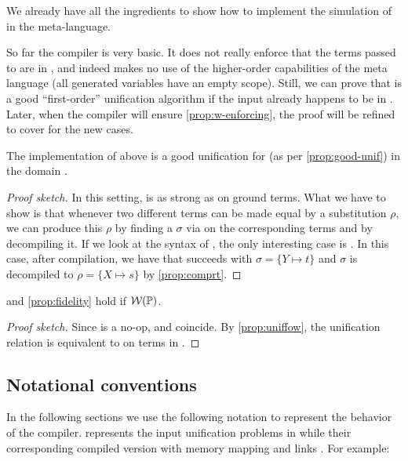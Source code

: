 We already have all the ingredients to show how to implement the simulation of
\Uo{} in the meta-language.



\noindent
So far the compiler is very basic. It does not really
enforce that the terms passed to \hstep are in \wellb,
and indeed makes no use of the higher-order capabilities
of the meta language (all generated
variables have an empty scope).
Still, we can prove that \Uo is a good
``first-order'' unification algorithm if the input
already happens to be in \wellb.
Later, when the compiler will ensure \cref{prop:w-enforcing},
the proof will be refined to cover for the new cases.

\begin{theorem}\label{prop:uniffow}
  The implementation of \Uo above is a good unification
  for \Eo
  (as per \cref{prop:good-unif})
  in the domain \wellb.
\end{theorem}

\begin{proof}[Proof sketch]
In this setting, \Ee is as strong as \Eo on ground terms.
What we have to show is that whenever two different \Fo{}
terms can be made equal by a substitution $\rho$,
we can produce this $\rho$ by finding
a $\sigma$ via \Ue{} on the corresponding \Ho terms and by decompiling it.
If we look at the syntax of \Fo{}, the only interesting case is
. In this case, after compilation, we have
that succeeds with $\sigma = \{ Y \mapsto t\}$ and
$\sigma$ is decompiled to $\rho = \{ X \mapsto s\}$ by \cref{prop:comprt}.
\end{proof}

\begin{theorem}\label{thm:fidfow}
   and \cref{prop:fidelity} hold if $\mathcal{W}{(\mathbb{P})}$. 
\end{theorem}
\begin{proof}[Proof sketch]
Since  is a no-op, \fstep and \hstep coincide. By
\cref{prop:uniffow}, the unification relation \Ue is equivalent to
\Uo on terms in \wellb.
\end{proof}

\subsection{Notational conventions}

In the following sections we use the following notation to represent
the behavior of the compiler. 
\foUnifPb represents the input unification problems in \Fo{}
while \hoUnifPb their corresponding compiled version with memory mapping
\mapStore and links \linkStore. For example:
%

